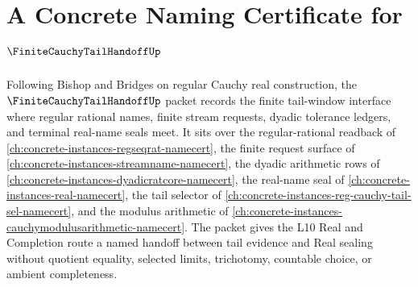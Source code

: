 \chapter{A Concrete Naming Certificate for $\FiniteCauchyTailHandoffUp$}
\label{ch:concrete-instances-finite-cauchy-tail-handoff-namecert}

Following Bishop and Bridges on regular Cauchy real construction, the $\FiniteCauchyTailHandoffUp$ packet records the finite tail-window interface where regular rational names, finite stream requests, dyadic tolerance ledgers, and terminal real-name seals meet. It sits over the regular-rational readback of \autoref{ch:concrete-instances-regseqrat-namecert}, the finite request surface of \autoref{ch:concrete-instances-streamname-namecert}, the dyadic arithmetic rows of \autoref{ch:concrete-instances-dyadicratcore-namecert}, the real-name seal of \autoref{ch:concrete-instances-real-namecert}, the tail selector of \autoref{ch:concrete-instances-reg-cauchy-tail-sel-namecert}, and the modulus arithmetic of \autoref{ch:concrete-instances-cauchymodulusarithmetic-namecert}. The packet gives the L10 Real and Completion route a named handoff between tail evidence and Real sealing without quotient equality, selected limits, trichotomy, countable choice, or ambient completeness.

